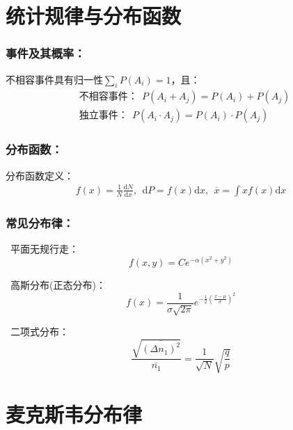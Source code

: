 \documentclass[zihao=-4,UTF8]{report}
\begin{document}
\section{统计规律与分布函数}
\subsubsection{事件及其概率：}
不相容事件具有归一性$\sum_{i} P(A_i) = 1$，且：
\begin{align}
    &\text{不相容事件：}\ \ P(A_i+A_j) = P(A_i) + P(A_j)\\
    &\text{独立事件：}\ \ P(A_i\cdot A_j) = P(A_i) \cdot P(A_j)
\end{align}
\subsubsection{分布函数：}
分布函数定义：
\begin{align}
    f(x) = \frac{1}{N}\frac{\mathrm{d}N}{\mathrm{d}x},\ \ \mathrm{d}P = f(x) \mathrm{d}x,\ \ \overline{x} = \int xf(x)\mathrm{d}x
\end{align}

\subsubsection{常见分布律：}
\ 平面无规行走：
\begin{equation}
    f(x,y) = Ce^{-\alpha (x^2+y^2)}
\end{equation}\par
{}\ 高斯分布(正态分布)：
\begin{equation}
    f(x) = \frac{1}{\sigma \sqrt{2\pi }}e^{-\frac{1}{2}(\frac{x-\mu }{\sigma})^2}
\end{equation}\par
{}\ 二项式分布：
\begin{equation}
    \frac{\sqrt{\overline{(\Delta n_1)^2}}}{\overline{n_1}} = \frac{1}{\sqrt{N}}\sqrt{\frac{q}{p}}    
\end{equation}

\section{麦克斯韦分布律}
\end{document}

